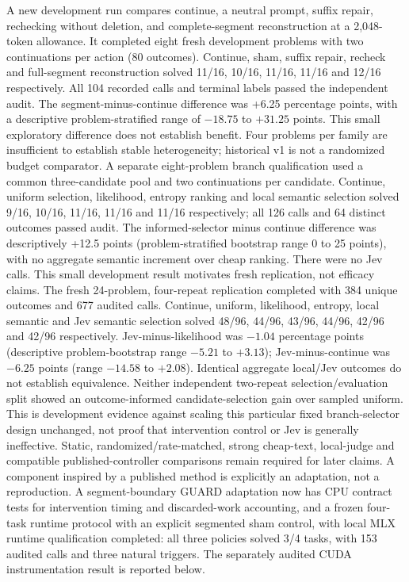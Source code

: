 \documentclass[11pt]{article}
\begin{document}
A new development run compares continue, a neutral prompt, suffix repair, rechecking without deletion, and complete-segment reconstruction at a 2,048-token allowance. It completed eight fresh development problems with two continuations per action (80 outcomes). Continue, sham, suffix repair, recheck and full-segment reconstruction solved 11/16, 10/16, 11/16, 11/16 and 12/16 respectively. All 104 recorded calls and terminal labels passed the independent audit. The segment-minus-continue difference was +6.25 percentage points, with a descriptive problem-stratified range of $-18.75$ to $+31.25$ points. This small exploratory difference does not establish benefit. Four problems per family are insufficient to establish stable heterogeneity; historical v1 is not a randomized budget comparator. A separate eight-problem branch qualification used a common three-candidate pool and two continuations per candidate. Continue, uniform selection, likelihood, entropy ranking and local semantic selection solved 9/16, 10/16, 11/16, 11/16 and 11/16 respectively; all 126 calls and 64 distinct outcomes passed audit. The informed-selector minus continue difference was descriptively +12.5 points (problem-stratified bootstrap range 0 to 25 points), with no aggregate semantic increment over cheap ranking. There were no Jev calls. This small development result motivates fresh replication, not efficacy claims. The fresh 24-problem, four-repeat replication completed with 384 unique outcomes and 677 audited calls. Continue, uniform, likelihood, entropy, local semantic and Jev semantic selection solved 48/96, 44/96, 43/96, 44/96, 42/96 and 42/96 respectively. Jev-minus-likelihood was $-1.04$ percentage points (descriptive problem-bootstrap range $-5.21$ to $+3.13$); Jev-minus-continue was $-6.25$ points (range $-14.58$ to $+2.08$). Identical aggregate local/Jev outcomes do not establish equivalence. Neither independent two-repeat selection/evaluation split showed an outcome-informed candidate-selection gain over sampled uniform. This is development evidence against scaling this particular fixed branch-selector design unchanged, not proof that intervention control or Jev is generally ineffective. Static, randomized/rate-matched, strong cheap-text, local-judge and compatible published-controller comparisons remain required for later claims. A component inspired by a published method is explicitly an adaptation, not a reproduction. A segment-boundary GUARD adaptation now has CPU contract tests for intervention timing and discarded-work accounting, and a frozen four-task runtime protocol with an explicit segmented sham control, with local MLX runtime qualification completed: all three policies solved 3/4 tasks, with 153 audited calls and three natural triggers. The separately audited CUDA instrumentation result is reported below.
\end{document}
